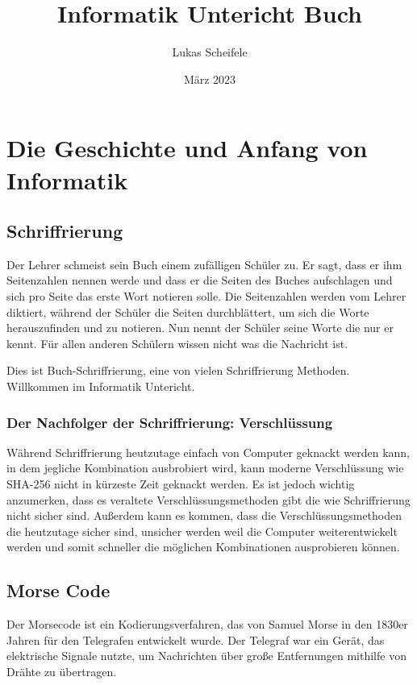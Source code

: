 \documentclass[12pt]{article}
\title{Informatik Untericht Buch}
\author{Lukas Scheifele}
\date{März 2023}
\begin{document}
\maketitle
\clearpage
\tableofcontents
\clearpage


\section{Die Geschichte und Anfang von Informatik}
\subsection{Schriffrierung}

Der Lehrer schmeist sein Buch einem zufälligen Schüler zu. Er sagt, dass er ihm Seitenzahlen nennen werde und dass er die Seiten des Buches aufschlagen und sich pro Seite das erste Wort notieren solle.
Die Seitenzahlen werden vom Lehrer diktiert, während der Schüler die Seiten durchblättert, um sich die Worte herauszufinden und zu notieren.
Nun nennt der Schüler seine Worte die nur er kennt. Für allen anderen Schülern wissen nicht was die Nachricht ist.

Dies ist Buch-Schriffrierung, eine von vielen Schriffrierung Methoden.
Willkommen im Informatik Untericht.

\subsubsection{Der Nachfolger der Schriffrierung: Verschlüssung}
Während Schriffrierung heutzutage einfach von Computer geknackt werden kann, in dem jegliche Kombination ausbrobiert wird, kann moderne Verschlüssung wie SHA-256 nicht in kürzeste Zeit geknackt werden.
Es ist jedoch wichtig anzumerken, dass es veraltete Verschlüssungsmethoden gibt die wie Schriffrierung nicht sicher sind. Außerdem kann es kommen, dass die Verschlüssungsmethoden die heutzutage sicher sind, 
unsicher werden weil die Computer weiterentwickelt werden und somit schneller die möglichen Kombinationen ausprobieren können.


\subsection{Morse Code}
Der Morsecode ist ein Kodierungsverfahren, das von Samuel Morse in den 1830er Jahren für den Telegrafen entwickelt wurde. 
Der Telegraf war ein Gerät, das elektrische Signale nutzte, um Nachrichten über große Entfernungen mithilfe von Drähte zu übertragen.
\end{document}
